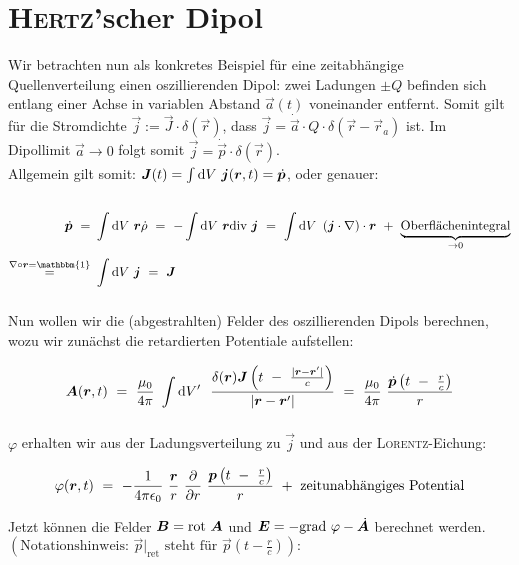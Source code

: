 \section{\textsc{Hertz}'scher Dipol}

Wir betrachten nun als konkretes Beispiel für eine zeitabhängige Quellenverteilung einen oszillierenden Dipol: zwei Ladungen $\pm Q$ befinden sich entlang einer Achse in variablen Abstand $\vec{a}(t)$ voneinander entfernt. Somit gilt für die Stromdichte $\vec{j} := \vec{J}\cdot\delta(\vec{r})$, dass $\vec{j}=\dot{\vec{a}}\cdot Q \cdot\delta(\vec{r}-\vec{r}_a)$ ist. Im Dipollimit $\vec{a}\rightarrow 0$ folgt somit $\vec{j}=\dot{\vec{p}}\cdot\delta(\vec{r})$.\\
Allgemein gilt somit: $\bm{J}(t) = \int\limits_{{}}^{{}}\mathrm{d}{V}\  \bm{j}(\bm{r},t) = \dot{\bm{p}}$, oder genauer:

\begin{align*}
\dot{\vec{p}} \ = \ &\Int{}{}{V}\vec{r}\dot{\rho} \ = \ -\Int{}{}{V}\vec{r}\div\vec{j} \ = \ \Int{}{}{V}\left(\vec{j}\cdot\nabla\right)\cdot\vec{r} \ + \ \underbrace{\text{Oberflächenintegral}}_{\rightarrow 0} \\
\overset{\nabla\circ\vec{r}=\mathbbm{1}}{=} \ &\Int{}{}{V}\vec{j}  \ = \ \vec{J}
\end{align*}

Nun wollen wir die  (abgestrahlten) Felder des oszillierenden Dipols berechnen, wozu wir zunächst die retardierten Potentiale aufstellen:

\begin{equation*}
\vec{A}(\vec{r},t) \ = \ \frac{\mu_0}{4\pi}\ \Int{}{}{V'} \ \frac{\delta(\vec{r})\vec{J}\left(t \ - \ \frac{|\vec{r}-\vec{r}'|}{c}\right)}{|\vec{r}-\vec{r}'|} \ = \ \frac{\mu_0}{4\pi}\ \frac{\dot{\vec{p}}\left(t\ - \ \frac{r}{c}\right)}{r}
\end{equation*}

$\varphi$ erhalten wir aus der Ladungsverteilung zu $\vec{j}$ und aus der \textsc{Lorentz}-Eichung:

\begin{equation*}
\varphi(\vec{r},t)  \ = \ -\frac{1}{4\pi\epsilon_0} \ \frac{\vec{r}}{r} \ \pdiff{}{r} \ \frac{\vec{p}\left(t\ - \ \frac{r}{c}\right)}{r} \ + \ \text{zeitunabhängiges Potential}
\end{equation*}

Jetzt können die Felder $\bm{B}=\text{rot }\bm{A}$ und $\bm{E}=-\text{grad }\varphi-\dot{\bm{A}}$ berechnet werden.\\
$\left(\text{Notationshinweis: }\vec{p}|_{\text{ret}} \text{ steht für }\vec{p}\left(t-\frac{r}{c}\right)\right):$\\

